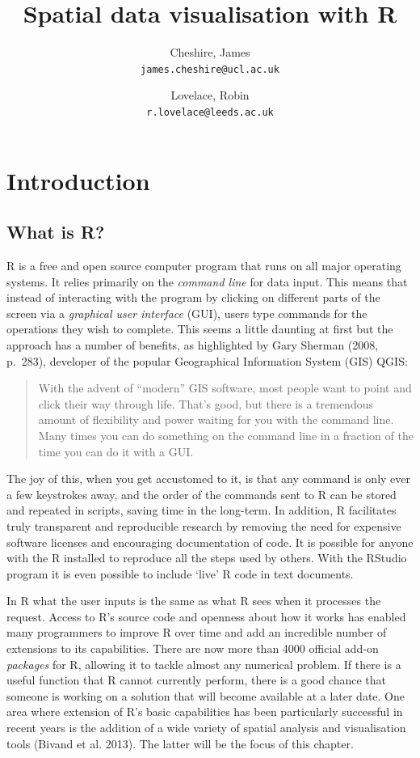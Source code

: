 \documentclass[]{article}
\author{
Cheshire, James\\
\texttt{james.cheshire@ucl.ac.uk}
\and
Lovelace, Robin\\
\texttt{r.lovelace@leeds.ac.uk}
}
\title{Spatial data visualisation with R}
\author{}
\date{}
\begin{document}
\section{Introduction}

\subsection{What is R?}

R is a free and open source computer program that runs on all major
operating systems. It relies primarily on the \emph{command line} for
data input. This means that instead of interacting with the program by
clicking on different parts of the screen via a \emph{graphical user
interface} (GUI), users type commands for the operations they wish to
complete. This seems a little daunting at first but the approach has a
number of benefits, as highlighted by Gary Sherman (2008, p.~283),
developer of the popular Geographical Information System (GIS) QGIS:

\begin{quote}
With the advent of ``modern'' GIS software, most people want to point
and click their way through life. That's good, but there is a tremendous
amount of flexibility and power waiting for you with the command line.
Many times you can do something on the command line in a fraction of the
time you can do it with a GUI.
\end{quote}

The joy of this, when you get accustomed to it, is that any command is
only ever a few keystrokes away, and the order of the commands sent to R
can be stored and repeated in scripts, saving time in the long-term. In
addition, R facilitates truly transparent and reproducible research by
removing the need for expensive software licenses and encouraging
documentation of code. It is possible for anyone with the R installed to
reproduce all the steps used by others. With the RStudio program it is
even possible to include `live' R code in text documents.

In R what the user inputs is the same as what R sees when it processes
the request. Access to R's source code and openness about how it works
has enabled many programmers to improve R over time and add an
incredible number of extensions to its capabilities. There are now more
than 4000 official add-on \emph{packages} for R, allowing it to tackle
almost any numerical problem. If there is a useful function that R
cannot currently perform, there is a good chance that someone is working
on a solution that will become available at a later date. One area where
extension of R's basic capabilities has been particularly successful in
recent years is the addition of a wide variety of spatial analysis and
visualisation tools (Bivand et al. 2013). The latter will be the focus
of this chapter.
\end{document}
